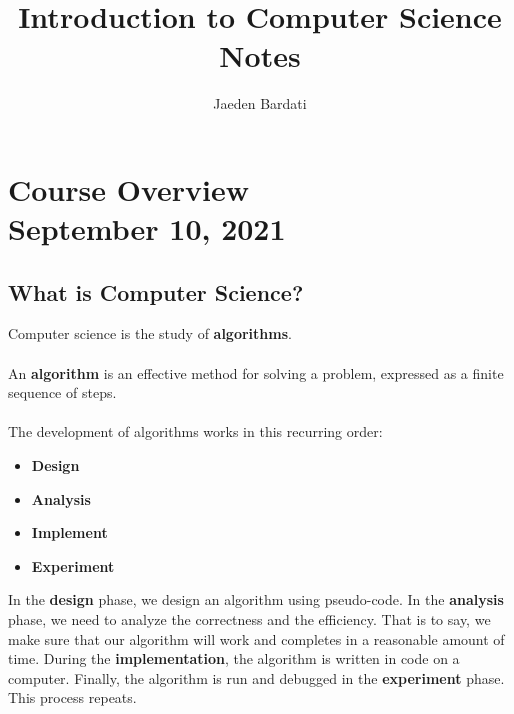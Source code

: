 \documentclass[]{article}
\title{Introduction to Computer Science Notes}
\author{Jaeden Bardati}
\begin{document}
\maketitle
\bigbreak

\section{Course Overview\\ {\large \normalfont September 10, 2021}}

\bigbreak

\subsection{What is Computer Science?}

\bigbreak

Computer science is the study of \textbf{algorithms}.\\\\
An \textbf{algorithm} is an effective method for solving a problem, expressed as a finite sequence of steps.\\\\
The development of algorithms works in this recurring order:
\begin{itemize}
	\item \textbf{Design}
	\item \textbf{Analysis}
	\item \textbf{Implement}
	\item \textbf{Experiment}\smallskip
\end{itemize}

\noindent In the \textbf{design} phase, we design an algorithm using pseudo-code. In the \textbf{analysis} phase, we need to analyze the correctness and the efficiency. That is to say, we make sure that our algorithm will work and completes in a reasonable amount of time. During the \textbf{implementation}, the algorithm is written in code on a computer. Finally, the algorithm is run and debugged in the \textbf{experiment} phase. This process repeats.
\end{document}
